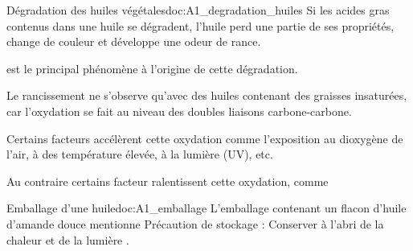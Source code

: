 



\begin{doc}{Dégradation des huiles végétales}{doc:A1_degradation_huiles}
  Si les acides gras contenus dans une huile se dégradent, l’huile perd une partie de ses propriétés, change de couleur et développe une odeur de rance.
  \begin{encart}  
     est le principal phénomène à l’origine de cette dégradation.
  \end{encart}
  Le rancissement ne s'observe qu'avec des huiles contenant des graisses insaturées, car l'oxydation se fait au niveau des doubles liaisons carbone-carbone.
  \begin{encart}  
    Certains facteurs accélèrent cette oxydation comme l’exposition au dioxygène de l’air, à des température élevée, à la lumière (UV), etc.
  \end{encart}
  \begin{encart}
    Au contraire certains facteur ralentissent cette oxydation, comme 
  \end{encart}
\end{doc}



\begin{doc}{Emballage d'une huile}{doc:A1_emballage}  
  L'emballage contenant un flacon d'huile d'amande douce mentionne \og Précaution de stockage : Conserver à l’abri de la chaleur et de la lumière \fg.
\end{doc}



